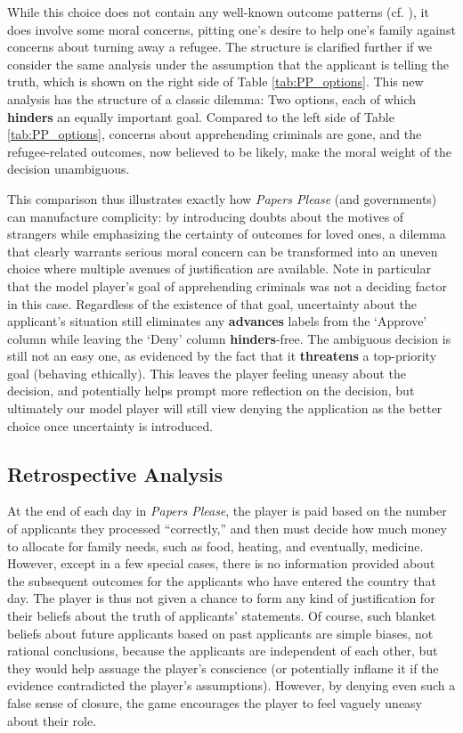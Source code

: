 \documentclass[arts,article,submit,moreauthors,pdftex,10pt,a4paper]{Definitions/mdpi}
\newcommand{\advances}{\textbf{\color{advances}advances}}
\newcommand{\threatens}{\textbf{\color{threatens}threatens}}
\newcommand{\hinders}{\textbf{\color{hinders}hinders}}
\begin{document}
While this choice does not contain any well-known outcome patterns (cf. \cite{mawhorter2014towards}), it does involve some moral concerns, pitting one's desire to help one's family against concerns about turning away a refugee.
%
The structure is clarified further if we consider the same analysis under the assumption that the applicant is telling the truth, which is shown on the right side of Table \ref{tab:PP_options}.
%
This new analysis has the structure of a classic dilemma: Two options, each of which \hinders{} an equally important goal.
%
Compared to the left side of Table \ref{tab:PP_options}, concerns about apprehending criminals are gone, and the refugee-related outcomes, now believed to be likely, make the moral weight of the decision unambiguous.


This comparison thus illustrates exactly how \emph{Papers Please} (and governments) can manufacture complicity: by introducing doubts about the motives of strangers while emphasizing the certainty of outcomes for loved ones, a dilemma that clearly warrants serious moral concern can be transformed into an uneven choice where multiple avenues of justification are available.
%
Note in particular that the model player's goal of apprehending criminals was not a deciding factor in this case.
%
Regardless of the existence of that goal, uncertainty about the applicant's situation still eliminates any \advances{} labels from the `Approve' column while leaving the `Deny' column \hinders{}-free.
%
The ambiguous decision is still not an easy one, as evidenced by the fact that it \threatens{} a top-priority goal (behaving ethically).
%
This leaves the player feeling uneasy about the decision, and potentially helps prompt more reflection on the decision, but ultimately our model player will still view denying the application as the better choice once uncertainty is introduced.

\subsection{Retrospective Analysis}

At the end of each day in \emph{Papers Please}, the player is paid based on the number of applicants they processed ``correctly,'' and then must decide how much money to allocate for family needs, such as food, heating, and eventually, medicine.
%
However, except in a few special cases, there is no information provided about the subsequent outcomes for the applicants who have entered the country that day.
%
The player is thus not given a chance to form any kind of justification for their beliefs about the truth of applicants' statements.
%
Of course, such blanket beliefs about future applicants based on past applicants are simple biases, not rational conclusions, because the applicants are independent of each other, but they would help assuage the player's conscience (or potentially inflame it if the evidence contradicted the player's assumptions).
%
However, by denying even such a false sense of closure, the game encourages the player to feel vaguely uneasy about their role.
\end{document}
